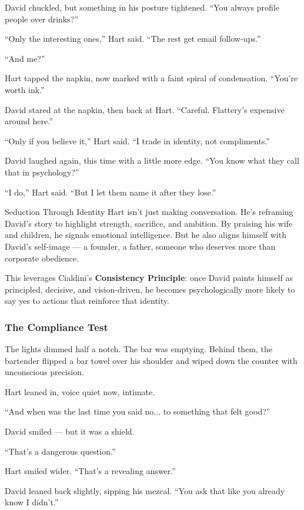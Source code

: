 David chuckled, but something in his posture tightened. “You always profile people over drinks?”

“Only the interesting ones,” Hart said. “The rest get email follow-ups.”

“And me?”

Hart tapped the napkin, now marked with a faint spiral of condensation. “You’re worth ink.”

David stared at the napkin, then back at Hart. “Careful. Flattery’s expensive around here.”

“Only if you believe it,” Hart said. “I trade in identity, not compliments.”

David laughed again, this time with a little more edge. “You know what they call that in psychology?”

“I do,” Hart said. “But I let them name it after they lose.”

\begin{PsychologicalSidebar}{Seduction Through Identity}
Hart isn’t just making conversation. He’s reframing David’s story to highlight strength, sacrifice, and ambition.
By praising his wife and children, he signals emotional intelligence. But he also aligns himself with 
David’s self-image — a founder, a father, someone who deserves more than corporate obedience.

This leverages Cialdini’s \textbf{Consistency Principle}: once David paints himself as principled, decisive, 
and vision-driven, he becomes psychologically more likely to say yes to actions that reinforce that identity.
\end{PsychologicalSidebar}


\subsubsection{The Compliance Test}


The lights dimmed half a notch. The bar was emptying. Behind them, the bartender flipped a bar towel over his shoulder and wiped down the counter with unconscious precision.

Hart leaned in, voice quiet now, intimate.

“And when was the last time you said no... to something that felt good?”

David smiled — but it was a shield.

“That’s a dangerous question.”

Hart smiled wider. “That’s a revealing answer.”

David leaned back slightly, sipping his mezcal. “You ask that like you already know I didn’t.”

